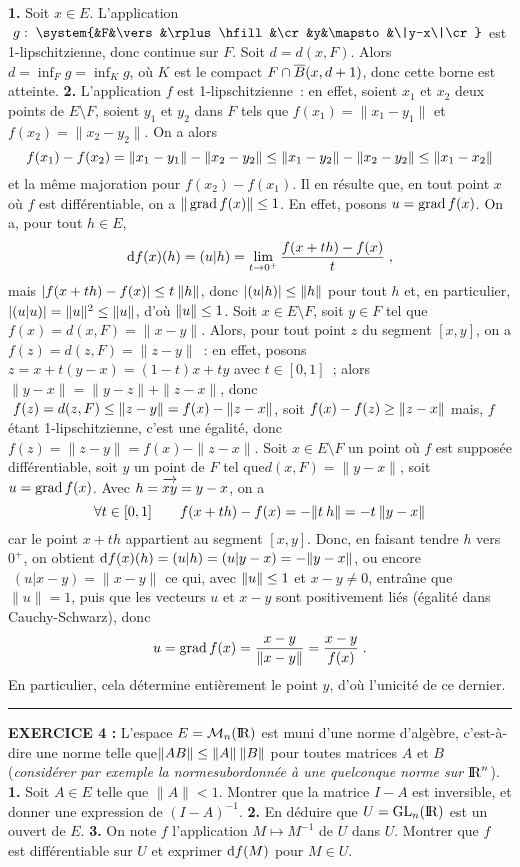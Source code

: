 \documentclass{article}
\begin{document}
{\bf 1.} Soit $x\in E$. L'application $\;g:\;\system{&F&\vers&\rplus\hfill&\cr &y&\mapsto&\|y-x\|\cr}$ est 1-lipschitzienne, donc continue sur $F$. Soit $d=d(x,F)$. Alors $d=\inf_Fg=\inf_Kg$, o\`u $K$ est le compact $F\cap\overline{B}(x,d+1)$, donc cette borne est atteinte.
\msk
{\bf 2.} L'application $f$ est 1-lipschitzienne~: en effet, soient $x_1$ et $x_2$ deux points de $E\setminus F$, soient $y_1$ et $y_2$ dans $F$ tels que $f(x_1)=\|x_1-y_1\|$ et $f(x_2)=\|x_2-y_2\|$. On a alors\vv
$$f(x_1)-f(x_2)=\|x_1-y_1\|-\|x_2-y_2\|\leq\|x_1-y_2\|-\|x_2-y_2\|\leq\|x_1-x_2\|$$
et la m\^eme majoration pour $f(x_2)-f(x_1)$.\ssk\sect
Il en r\'esulte que, en tout point $x$ o\`u $f$ est diff\'erentiable, on a $\|\mathop{\rm grad}\nolimits f(x)\|\leq1$. En effet, posons $u=\mathop{\rm grad}\nolimits f(x)$. On a, pour tout $h\in E$,\vv
$${\rm d}f(x)(h)=(u|h)=\lim_{t\rightarrow0^+}{f(x+th)-f(x)\over t}\;,$$
mais $|f(x+th)-f(x)|\leq t\>\|h\|$, donc $|(u|h)|\leq\|h\|$ pour tout $h$ et, en particulier,\break $|(u|u)|=\|u\|^2\leq\|u\|$, d'o\`u $\|u\|\leq1$.\msk\sect
Soit $x\in E\setminus F$, soit $y\in F$ tel que $f(x)=d(x,F)=\|x-y\|$. Alors, pour tout point $z$ du segment $[x,y]$, on a $f(z)=d(z,F)=\|z-y\|$~: en effet, posons $z=x+t(y-x)=(1-t)x+ty$ avec $t\in[0,1]$~; alors $\|y-x\|=\|y-z\|+\|z-x\|$, donc $\;f(z)=d(z,F)\leq\|z-y\|=f(x)-\|z-x\|$, soit $f(x)-f(z)\geq\|z-x\|$ mais, $f$ \'etant 1-lipschitzienne, c'est une \'egalit\'e, donc\break $f(z)=\|z-y\|=f(x)-\|z-x\|$.
\msk\sect
Soit $x\in E\setminus F$ un point o\`u $f$ est suppos\'ee diff\'erentiable, soit $y$ un point de $F$ tel que\break $d(x,F)=\|y-x\|$, soit $u=\mathop{\rm grad}\nolimits f(x)$. Avec $h=\vect{xy}=y-x$, on a\vv
$$\forall t\in[0,1]\qquad f(x+th)-f(x)=-\|t\>h\|=-t\>\|y-x\|$$
car le point $x+th$ appartient au segment $[x,y]$. Donc, en faisant tendre $h$ vers $0^+$, on obtient ${\rm d}f(x)(h)=(u|h)=(u|y-x)=-\|y-x\|$, ou encore $\;(u|x-y)=\|x-y\|$ ce qui, avec $\|u\|\leq1$ et $x-y\not=0$, entra\^\i ne que $\|u\|=1$, puis que les vecteurs $u$ et $x-y$ sont positivement li\'es (\'egalit\'e dans Cauchy-Schwarz), donc\vv
$$u=\mathop{\rm grad}\nolimits f(x)={x-y\over\|x-y\|}={x-y\over f(x)}\;.$$
En particulier, cela d\'etermine enti\`erement le point $y$, d'o\`u l'unicit\'e de ce dernier.

\bsk
\hrule
\bsk

{\bf EXERCICE 4 :}\msk
L'espace $E={\cal M}_n({\rm I\kern-0.6mm R})$ est muni d'une norme d'alg\`ebre, c'est-\`a-dire une norme telle que\break $\|AB\|\leq\|A\|\>\|B\|$ pour toutes matrices $A$ et $B$ ({\it consid\'erer par exemple la norme\break subordonn\'ee \`a une quelconque norme sur ${\rm I\kern-0.6mm R}^n$}).\msk
{\bf 1.} Soit $A\in E$ telle que $\|A\|<1$. Montrer que la matrice $I-A$ est inversible, et donner une expression de $(I-A)^{-1}$.\msk
{\bf 2.} En d\'eduire que $U={\rm GL}_n({\rm I\kern-0.6mm R})$ est un ouvert de $E$.\msk
{\bf 3.} On note $f$ l'application $M\mapsto M^{-1}$ de $U$ dans $U$. Montrer que $f$ est diff\'erentiable sur $U$ et exprimer ${\rm d}f(M)$ pour $M\in U$.
\end{document}
